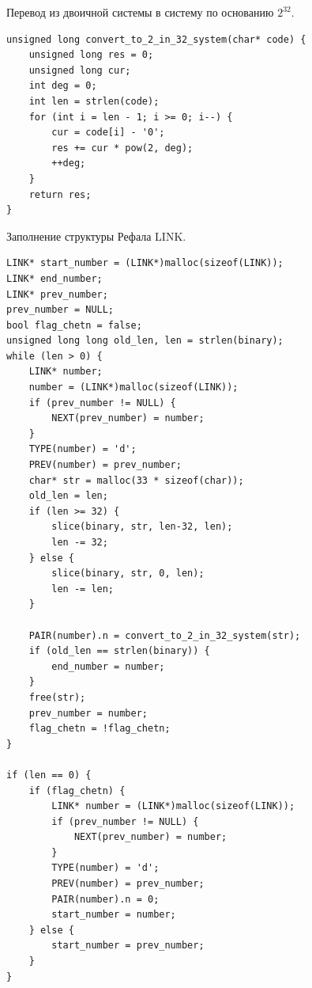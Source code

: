 \documentclass[14pt, russian]{scrartcl}
\begin{document}
\newpage
\begin{code}
\caption{Перевод из двоичной системы в систему по основанию $2^{32}$.}
\label{lst:octaladd}
\begin{verbatim}
unsigned long convert_to_2_in_32_system(char* code) {
    unsigned long res = 0;
    unsigned long cur;
    int deg = 0;
    int len = strlen(code);
    for (int i = len - 1; i >= 0; i--) {
        cur = code[i] - '0';
        res += cur * pow(2, deg);
        ++deg;
    }
    return res;
}
\end{verbatim}
\end{code}

\begin{code}
\caption{Заполнение структуры Рефала LINK.}
\label{lst:octaladd}
\begin{verbatim}
LINK* start_number = (LINK*)malloc(sizeof(LINK));
LINK* end_number;
LINK* prev_number;
prev_number = NULL;
bool flag_chetn = false;
unsigned long long old_len, len = strlen(binary);
while (len > 0) {
    LINK* number;
    number = (LINK*)malloc(sizeof(LINK));
    if (prev_number != NULL) {
        NEXT(prev_number) = number;
    }
    TYPE(number) = 'd';
    PREV(number) = prev_number;
    char* str = malloc(33 * sizeof(char));
    old_len = len;
    if (len >= 32) {
        slice(binary, str, len-32, len);
        len -= 32;
    } else {
        slice(binary, str, 0, len);
        len -= len;
    }
    
    PAIR(number).n = convert_to_2_in_32_system(str);
    if (old_len == strlen(binary)) {
        end_number = number;
    }
    free(str);
    prev_number = number; 
    flag_chetn = !flag_chetn;
}
    
if (len == 0) {
    if (flag_chetn) {
        LINK* number = (LINK*)malloc(sizeof(LINK));
        if (prev_number != NULL) {
            NEXT(prev_number) = number;
        }
        TYPE(number) = 'd';
        PREV(number) = prev_number;
        PAIR(number).n = 0;
        start_number = number;
    } else {
        start_number = prev_number;
    }
}
\end{verbatim}
\end{code}
\end{document}
